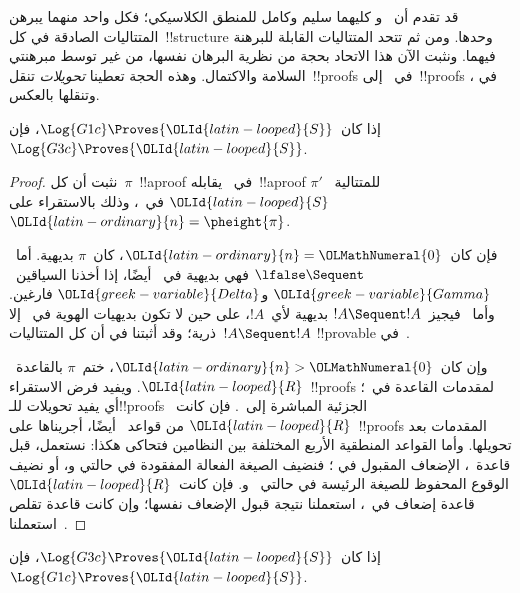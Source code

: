 \documentclass[../../../include/open-logic-section]{subfiles}
\begin{document}


قد تقدم أن~ و كليهما سليم وكامل للمنطق الكلاسيكي؛
فكل واحد منهما يبرهن المتتاليات الصادقة في كل~!!{structure} وحدها. ومن
ثم تتحد المتتاليات القابلة للبرهنة فيهما. ونثبت الآن هذا الاتحاد بحجة
من نظرية البرهان نفسها، من غير توسط مبرهنتي السلامة والاكتمال. وهذه الحجة
تعطينا \emph{تحويلات} تنقل~!!{proof}s في~ إلى~!!{proof}s في
، وتنقلها بالعكس.

\begin{prop}
إذا كان~$\Log{G1c}\Proves {\OLId{latin-looped}{S}}$، فإن~$\Log{G3c}\Proves {\OLId{latin-looped}{S}}$.
\end{prop}

\begin{proof}
  نثبت أن كل~$\pi$~!!a{proof} في~ يقابله~!!a{proof}
  $\pi'$ للمتتالية~${\OLId{latin-looped}{S}}$ في~، وذلك بالاستقراء على
  ${\OLId{latin-ordinary}{n}}=\pheight{\pi}$.

  فإن كان~${\OLId{latin-ordinary}{n}}={\OLMathNumeral{0}}$، كان~$\pi$ بديهية. أما~$\lfalse\Sequent\quad$ فهي
  بديهية في~ أيضًا، إذا أخذنا السياقين~${\OLId{greek-variable}{Gamma}}$ و${\OLId{greek-variable}{Delta}}$
  فارغين. وأما~ فيجيز~$!A\Sequent !A$ بديهية لأي~$!A$، على
  حين لا تكون بديهيات الهوية في~ إلا ذرية؛ وقد أثبتنا في
   أن كل المتتاليات~$!A\Sequent !A$
  !!{provable} في~.

  وإن كان~${\OLId{latin-ordinary}{n}}>{\OLMathNumeral{0}}$، ختم~$\pi$ بالقاعدة~${\OLId{latin-looped}{R}}$. ويفيد فرض الاستقراء~!!{proof}s
  لمقدمات القاعدة في~؛ أي يفيد تحويلات للـ!!{proof}s الجزئية
  المباشرة إلى~. فإن كانت~${\OLId{latin-looped}{R}}$ من قواعد~ أيضًا، أجريناها
  على~!!{proof}s المقدمات بعد تحويلها. وأما القواعد المنطقية الأربع المختلفة بين
  النظامين فتحاكى هكذا: نستعمل، قبل قاعدة~، الإضعاف المقبول في
  ؛ فنضيف الصيغة الفعالة المفقودة في حالتي
  \LeftR{\land} و\RightR{\lor}، أو نضيف الوقوع المحفوظ للصيغة الرئيسة
  في حالتي~\LeftR{\lforall} و\RightR{\lexists}. فإن كانت~${\OLId{latin-looped}{R}}$ قاعدة
  إضعاف في~، استعملنا نتيجة قبول الإضعاف نفسها؛ وإن كانت قاعدة
  تقلص استعملنا~.
\end{proof}

\begin{prop}
إذا كان~$\Log{G3c}\Proves {\OLId{latin-looped}{S}}$، فإن~$\Log{G1c}\Proves {\OLId{latin-looped}{S}}$.
\end{prop}
\end{document}

